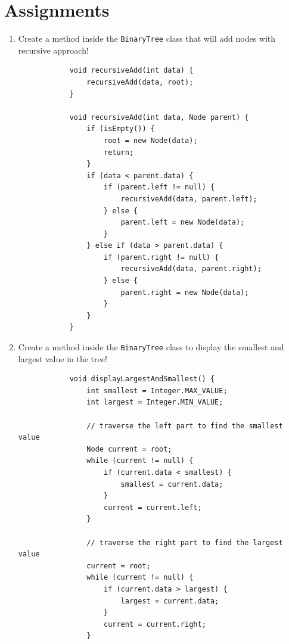 \documentclass[12pt,titlepage]{article}
\begin{document}
\pagebreak

\section{Assignments}
\begin{enumerate}
    \item {
        Create a method inside the \texttt{BinaryTree} class that will add nodes with recursive approach!

        \begin{verbatim}
            void recursiveAdd(int data) {
                recursiveAdd(data, root);
            }

            void recursiveAdd(int data, Node parent) {
                if (isEmpty()) {
                    root = new Node(data);
                    return;
                }
                if (data < parent.data) {
                    if (parent.left != null) {
                        recursiveAdd(data, parent.left);
                    } else {
                        parent.left = new Node(data);
                    }
                } else if (data > parent.data) {
                    if (parent.right != null) {
                        recursiveAdd(data, parent.right);
                    } else {
                        parent.right = new Node(data);
                    }
                }
            }
        \end{verbatim}
    }
    \pagebreak
    \item {
        Create a method inside the \texttt{BinaryTree} class to display the smallest and largest value in the tree!

        \begin{verbatim}
            void displayLargestAndSmallest() {
                int smallest = Integer.MAX_VALUE;
                int largest = Integer.MIN_VALUE;

                // traverse the left part to find the smallest value
                Node current = root;
                while (current != null) {
                    if (current.data < smallest) {
                        smallest = current.data;
                    }
                    current = current.left;
                }

                // traverse the right part to find the largest value
                current = root;
                while (current != null) {
                    if (current.data > largest) {
                        largest = current.data;
                    }
                    current = current.right;
                }


\end{verbatim}}
\end{enumerate}
\end{document}
